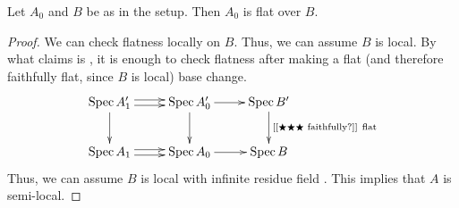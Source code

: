  \begin{lemma} \label{lec13L:A0flat/B}
   Let $A_0$ and $B$ be as in the setup. Then $A_0$ is flat over $B$.
 \end{lemma}
 \begin{proof}
   We can check flatness locally on $B$. Thus, we can assume $B$ is local. By what
   \cite{Vistoli} claims is \cite[IV.2.7.1]{EGA} \anton{}, it is enough to check flatness
   after making a flat (and therefore faithfully flat, since $B$ is local) base change.
   \[\xymatrix{
    \spec A_1'\ar[d] \ar@<.5ex>[r]\ar@<-.5ex>[r] & \spec A_0' \ar[r] \ar[d]& \spec B'\ar[d]^{\text{\anton{faithfully?} flat}}\\
    \spec A_1 \ar@<.5ex>[r]\ar@<-.5ex>[r] & \spec A_0 \ar[r] & \spec B
   }\]
    Thus, we can assume $B$ is local with infinite residue field . This implies that $A$ is semi-local. 
 \end{proof}

